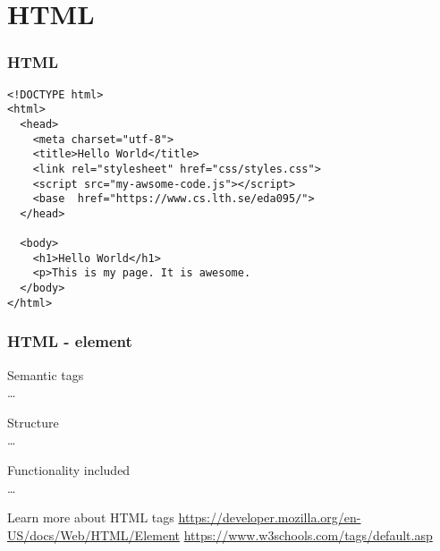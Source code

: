 \section{HTML}

\begin{frame}[fragile]
\frametitle{HTML}
\begin{lstlisting}[style=htmlcssjs]
<!DOCTYPE html>
<html>
  <head>
    <meta charset="utf-8">
    <title>Hello World</title>
    <link rel="stylesheet" href="css/styles.css">
    <script src="my-awsome-code.js"></script>
    <base  href="https://www.cs.lth.se/eda095/">
  </head>

  <body>
    <h1>Hello World</h1>
    <p>This is my page. It is awesome.
  </body>
</html>
\end{lstlisting}
\end{frame}

\begin{frame}[fragile]
\frametitle{HTML - element}

Semantic tags\\
\ldots
\bigskip

Structure\\
\ldots
\bigskip

Functionality included\\
\ldots
\bigskip
\color{structure}

Learn more about HTML tags \url{https://developer.mozilla.org/en-US/docs/Web/HTML/Element}
\url{https://www.w3schools.com/tags/default.asp}
\end{frame}

